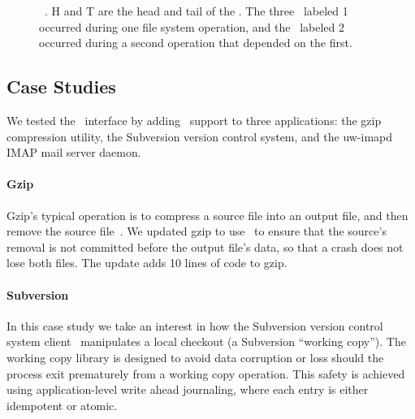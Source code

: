 \begin{figure}[htb]
\caption{\label{fig:opgroup-chdescs} \Opgroup\ \chdescs. H and T are the head
  and tail of the \opgroup.
  The three \chdescs\ labeled 1 occurred during one file system
  operation,
  and the \chdesc\ labeled 2 occurred during a second operation that
  depended on the first.}
\end{figure}

\subsection{Case Studies}
\label{sec:opgroup:casestudies}


We tested the \opgroup\ interface by adding \opgroup\ support to three
applications: the gzip compression utility, the Subversion version control
system, and the uw-imapd IMAP mail server daemon.

\paragraph{Gzip}
\label{sec:opgroup:gzip}

Gzip's typical operation is to compress a source file into an output file,
and then remove the source file~\cite{gzip}.
%
We updated gzip to use \opgroups\ to ensure that the source's removal
is not committed before the output file's data, so that a crash does
not lose both files. The update adds 10 lines of code to gzip.

\paragraph{Subversion}
\label{sec:opgroup:svn}

In this case study we take an interest in how the Subversion version
control system client~\cite{svn} manipulates a local checkout (a
Subversion ``working copy'').
%
The working copy library is designed to avoid data corruption or loss
should the process exit prematurely from a working copy operation.
%
This safety is achieved using application-level write ahead
journaling, where each entry is either idempotent or atomic.

